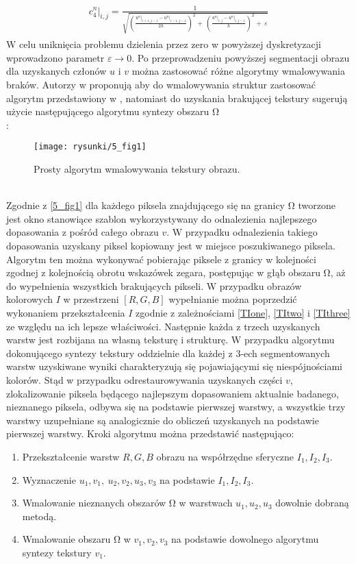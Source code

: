 \documentclass[12pt, twoside, openany]{report}
\theoremstyle{definition}
\begin{document}
\begin{align}
\begin{aligned}
c^n_4\big|_{i,j}=\frac{1}{\sqrt{{\left(\frac{u^n\big|_{i+1,j-1}-u^n\big|_{i-1,j-1}}{2h}\right)}^2+\ {\left(\frac{u^n\big|_{i,j}-u^n\big|_{i,j-1}}{h}\right)}^2+\ \varepsilon }}
\end{aligned}
\end{align}
W celu uniknięcia problemu dzielenia przez zero w powyższej dyskretyzacji wprowadzono parametr $\varepsilon \longrightarrow 0$. 
Po przeprowadzeniu powyższej segmentacji obrazu dla uzyskanych członów $u$ i $v$ można zastosować różne algorytmy wmalowywania braków. Autorzy w \cite{NavierStokesAndTexturePropagation} proponują aby do wmalowywania struktur zastosować algorytm przedstawiony w \cite{bertalmio2000image}, natomiast do uzyskania brakującej tekstury sugerują użycie następującego algorytmu syntezy obszaru $\mathrm{\Omega }$ \\:
\begin{figure}[!h]
	\centering
	\texttt{[image: rysunki/5\_fig1]}
	\caption{Prosty algorytm wmalowywania tekstury obrazu.}
	\label{5_fig1}
\end{figure} \\
Zgodnie z \autoref{5_fig1} dla każdego piksela znajdującego się na granicy $\mathrm{\Omega }$ tworzone jest okno stanowiące szablon wykorzystywany do odnalezienia najlepszego dopasowania z pośród całego obrazu $v$. W przypadku odnalezienia takiego dopasowania uzyskany piksel kopiowany jest w miejsce poszukiwanego piksela. Algorytm ten można wykonywać pobierając piksele z granicy w kolejności zgodnej z kolejnością obrotu wskazówek zegara, postępując w głąb obszaru $\mathrm{\Omega }$, aż do wypełnienia wszystkich brakujących pikseli. 
W przypadku obrazów kolorowych $I$ w przestrzeni $[R, G, B]$ wypełnianie można poprzedzić wykonaniem przekształcenia $I$ zgodnie z zależnościami \eqref{TIone}, \eqref{TItwo} i \eqref{TIthree} ze względu na ich lepsze właściwości. Następnie każda z trzech uzyskanych warstw jest rozbijana na własną teksturę i strukturę. W przypadku algorytmu dokonującego syntezy tekstury oddzielnie dla każdej z 3-ech segmentowanych warstw uzyskiwane wyniki charakteryzują się pojawiającymi się niespójnościami kolorów. Stąd w przypadku odrestaurowywania uzyskanych części $v$, zlokalizowanie piksela będącego najlepszym dopasowaniem aktualnie badanego, nieznanego piksela, odbywa się na podstawie pierwszej warstwy, a wszystkie trzy warstwy uzupełniane są analogicznie do obliczeń uzyskanych na podstawie pierwszej warstwy. Kroki algorytmu można przedstawić następująco:
\begin{enumerate}
\item
Przekształcenie warstw $R,G,B$ obrazu na współrzędne sferyczne $I_1,I_2,I_3$.
\item
Wyznaczenie $u_1,v_1,\ u_2,v_2,u_3,v_3$ na podstawie $I_1,I_2,I_3$.
\item
Wmalowanie nieznanych obszarów $\mathrm{\Omega }$ w warstwach $u_1,u_2,u_3$ dowolnie dobraną metodą.
\item
Wmalowanie obszaru $\mathrm{\Omega }$ w $v_1,v_2,v_3$ na podstawie dowolnego algorytmu syntezy tekstury $v_1$.
\end{enumerate}
\end{document}

